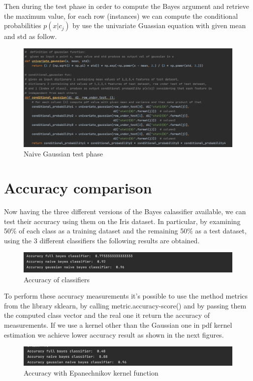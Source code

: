 \documentclass[12pt]{report}
\begin{document}
Then during the test phase in order to compute the Bayes argument and retrieve the maximum value, for each row (instances) we can compute the conditional probabilities $p(x|c_{j})$ by use the univariate Guassian equation with given mean and std as follow.

\begin{figure}[h!]
    \centering
    \includegraphics[width=16cm]{Pictures/Test phase naive gaussian.png}
    \caption{Naive Gaussian test phase}
\end{figure}
\newpage
\section{Accuracy comparison}
Now having the three different versions of the Bayes calassifier available, we can test their accuracy using them on the Iris dataset. In particular, by examining 50\% of each class as a training dataset and the remaining 50\% as a test dataset, using the 3 different classifiers the following results are obtained.

\begin{figure}[h!]
    \centering
    \includegraphics[width=16cm]{Pictures/Final accuracy.png}
    \caption{Accuracy of classifiers}
\end{figure}

To perform these accuracy measurements it's possible to use the method metrics from the library sklearn, by calling metric.accuracy-score() and by passing them the computed class vector and the real one it return the accuracy of measurements. If we use a kernel other than the Gaussian one in pdf kernel estimation we achieve lower accuracy result as shown in the next figures.

\begin{figure}[h!]
    \centering
    \includegraphics[width=14cm]{Pictures/epanechnikov kernel accuracy.png}
    \caption{Accuracy with Epanechnikov kernel function}
\end{figure}
\end{document}
